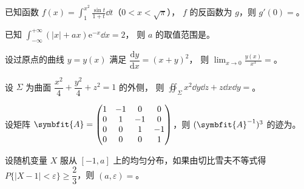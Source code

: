 \begin{question}[index=11]
已知函数 $\displaystyle f(x)=\int_1^{x^2}\frac{\sin t}{1+t}\dd t$（$0<x<\sqrt{\pi}$），
$f$ 的反函数为 $g$，则 $g'(0)=$\fillin。
\end{question}
\QuestionBreak

\begin{question}[index=12]
已知 $\displaystyle\int_{-\infty}^{+\infty}(|x|+ax)\mathrm e^{-x}\dd x=2$，
则 $a$ 的取值范围是\fillin。
\end{question}
\QuestionBreak

\begin{question}[index=13]
设过原点的曲线 $y=y(x)$ 满足 $\dfrac{\mathrm dy}{\mathrm dx}=(x+y)^2$，
则 $\displaystyle\lim_{x\to0}\frac{y(x)}{x^3}=$\fillin。
\end{question}
\QuestionBreak

\begin{question}[index=14]
设 $\Sigma$ 为曲面 $\dfrac{x^2}{4}+\dfrac{y^2}{4}+z^2=1$ 的外侧，
则 $\displaystyle\oiint_{\Sigma}x^2\dd y\dd z+z\dd x\dd y=$\fillin。
\end{question}
\QuestionBreak

\begin{question}[index=15]
设矩阵 $\symbfit{A}=\begin{pmatrix}
1&-1&0&0\\
0&1&-1&0\\
0&0&1&-1\\
0&0&0&1
\end{pmatrix}$，则 $(\symbfit{A}^{-1})^3$ 的迹为\fillin。
\end{question}
\QuestionBreak

\begin{question}[index=16]
设随机变量 $X$ 服从 $[-1,a]$ 上的均匀分布，如果由切比雪夫不等式得
$P\{|X-1|<\varepsilon\}\ge\dfrac{2}{3}$，则 $(a,\varepsilon)=$\fillin。
\end{question}
